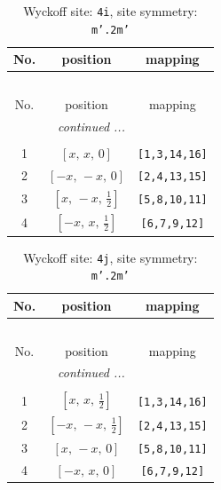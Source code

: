 \documentclass[fleqn,8pt]{jsarticle}
\begin{document}
\renewcommand{\arraystretch}{1.2}
\begin{longtable}{ccc}
\caption{Wyckoff site: {\tt 4i}, site symmetry: {\tt m'.2m'}}
 \\
 \hline \hline
No. & position & mapping \\ \hline \endfirsthead

\multicolumn{2}{l}{\tablename\ \thetable{}} \\
 \hline \hline
No. & position & mapping \\ \hline \endhead

 \hline \hline
\multicolumn{2}{r}{\footnotesize\it continued ...} \\ \endfoot

 \hline \hline
\multicolumn{2}{r}{} \\ \endlastfoot

1 & $\left[ x,\, x,\, 0 \right]$ & {\tt [1,3,14,16]} \\ \hline
2 & $\left[ - x,\, - x,\, 0 \right]$ & {\tt [2,4,13,15]} \\ \hline
3 & $\left[ x,\, - x,\, \frac{1}{2} \right]$ & {\tt [5,8,10,11]} \\ \hline
4 & $\left[ - x,\, x,\, \frac{1}{2} \right]$ & {\tt [6,7,9,12]} \\
\end{longtable}
\renewcommand{\arraystretch}{1.2}
\begin{longtable}{ccc}
\caption{Wyckoff site: {\tt 4j}, site symmetry: {\tt m'.2m'}}
 \\
 \hline \hline
No. & position & mapping \\ \hline \endfirsthead

\multicolumn{2}{l}{\tablename\ \thetable{}} \\
 \hline \hline
No. & position & mapping \\ \hline \endhead

 \hline \hline
\multicolumn{2}{r}{\footnotesize\it continued ...} \\ \endfoot

 \hline \hline
\multicolumn{2}{r}{} \\ \endlastfoot

1 & $\left[ x,\, x,\, \frac{1}{2} \right]$ & {\tt [1,3,14,16]} \\ \hline
2 & $\left[ - x,\, - x,\, \frac{1}{2} \right]$ & {\tt [2,4,13,15]} \\ \hline
3 & $\left[ x,\, - x,\, 0 \right]$ & {\tt [5,8,10,11]} \\ \hline
4 & $\left[ - x,\, x,\, 0 \right]$ & {\tt [6,7,9,12]} \\
\end{longtable}
\end{document}
